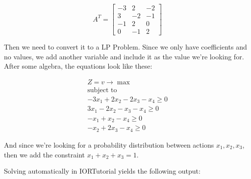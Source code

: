 \documentclass[titlepage, letterpaper]{article}
\begin{document}
$$A^T = 
\begin{bmatrix}
-3 & 2 & -2 \\
3 & -2 & -1 \\
-1 & 2 & 0 \\
0 & -1 & 2
\end{bmatrix} 
$$

Then we need to convert it to a LP Problem.
Since we only have coefficients and no values,
we add another variable and include it as the value we're looking for.
After some algebra, the equations look like these:

\begin{align}
    Z = v \to \max \\
    \text{subject to} \\
    -3x_1 + 2x_2 -2 x_3 -x_4 \geq 0 \\
    3 x_1 - 2x_2 -x_3 -x_4 \geq 0 \\
    -x_1 + x_2 -x_4 \geq 0 \\
    -x_2 + 2x_3 -x_4 \geq 0
\end{align}

And since we're looking for a probability distribution between actions $x_1, x_2, x_3$, then we add the constraint $x_1 + x_2 + x_3 = 1$.

Solving automatically in IORTutorial yields the following output:
\end{document}
